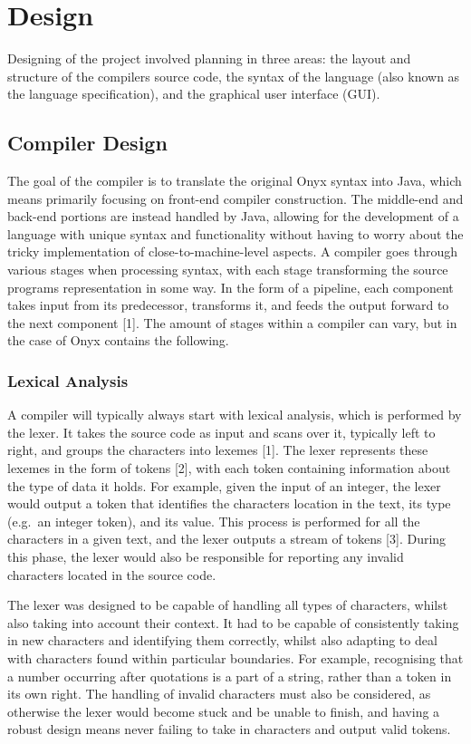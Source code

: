 \documentclass[
]{report}
\begin{document}
\chapter{Design}
Designing of the project involved planning in three areas: the layout
and structure of the compilers source code, the syntax of the language
(also known as the language specification), and the graphical user
interface (GUI).

\section{Compiler Design}
The goal of the compiler is to translate the original Onyx syntax into
Java, which means primarily focusing on front-end compiler construction.
The middle-end and back-end portions are instead handled by Java,
allowing for the development of a language with unique syntax and
functionality without having to worry about the tricky implementation of
close-to-machine-level aspects. A compiler goes through various stages
when processing syntax, with each stage transforming the source programs
representation in some way. In the form of a pipeline, each component
takes input from its predecessor, transforms it, and feeds the output
forward to the next component {[}1{]}. The amount of stages within a
compiler can vary, but in the case of Onyx contains the following.

\subsection{Lexical Analysis}
A compiler will typically always start with lexical analysis, which is
performed by the lexer. It takes the source code as input and scans over
it, typically left to right, and groups the characters into lexemes
{[}1{]}. The lexer represents these lexemes in the form of tokens
{[}2{]}, with each token containing information about the type of data
it holds. For example, given the input of an integer, the lexer would
output a token that identifies the characters location in the text, its
type (e.g.~an integer token), and its value. This process is performed
for all the characters in a given text, and the lexer outputs a stream
of tokens {[}3{]}. During this phase, the lexer would also be
responsible for reporting any invalid characters located in the source
code.

The lexer was designed to be capable of handling all types of
characters, whilst also taking into account their context. It had to be
capable of consistently taking in new characters and identifying them
correctly, whilst also adapting to deal with characters found within
particular boundaries. For example, recognising that a number occurring
after quotations is a part of a string, rather than a token in its own
right. The handling of invalid characters must also be considered, as
otherwise the lexer would become stuck and be unable to finish, and
having a robust design means never failing to take in characters and
output valid tokens.
\end{document}
